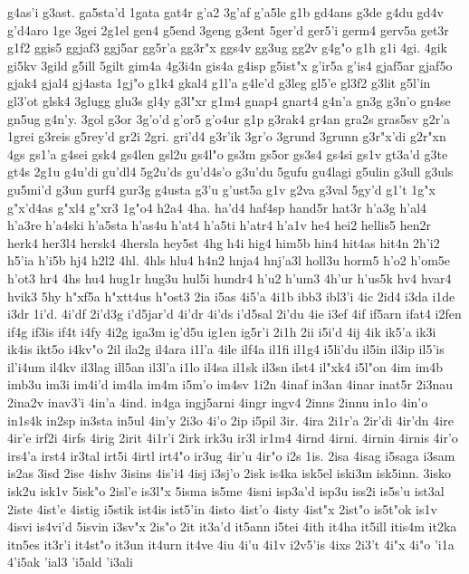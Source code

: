 {g4as'i
g3ast.
ga5sta'd
1gata
gat4r
g'a2
3g'af
g'a5le
g1b
gd4ans
g3de
g4du
gd4v
g'd4aro
1ge
3gei
2g1el
gen4
g5end
3geng
g3ent
5ger'd
ger5'i
germ4
gerv5a
get3r
g1f2
ggis5
ggjaf3
ggj5ar
gg5r'a
gg3r"x
ggs4v
gg3ug
gg2v
g4g"o
g1h
g1i
4gi.
4gik
gi5kv
3gild
g5ill
5gilt
gim4a
4g3i4n
gis4a
g4isp
g5ist"x
g'ir5a
g'is4
gjaf5ar
gjaf5o
gjak4
gjal4
gj4asta
1gj"o
g1k4
gkal4
g1l'a
g4le'd
g3leg
gl5'e
gl3f2
g3lit
g5l'in
gl3'ot
glsk4
3glugg
glu3s
gl4y
g3l"xr
g1m4
gnap4
gnart4
g4n'a
gn3g
g3n'o
gn4se
gn5ug
g4n'y.
3gol
g3or
3g'o'd
g'or5
g'o4ur
g1p
g3rak4
gr4an
gra2s
gras5sv
g2r'a
1grei
g3reis
g5rey'd
gr2i
2gri.
gri'd4
g3r'ik
3gr'o
3grund
3grunn
g3r"x'di
g2r"xn
4gs
gs1'a
g4sei
gsk4
gs4len
gsl2u
gs4l"o
gs3m
gs5or
gs3s4
gs4si
gs1v
gt3a'd
g3te
gt4s
2g1u
g4u'di
gu'dl4
5g2u'ds
gu'd4s'o
g3u'du
5gufu
gu4lagi
g5ulin
g3ull
g3uls
gu5mi'd
g3un
gurf4
gur3g
g4usta
g3'u
g'ust5a
g1v
g2va
g3val
5gy'd
g1't
1g"x
g"x'd4as
g"xl4
g"xr3
1g"o4
h2a4
4ha.
ha'd4
haf4sp
hand5r
hat3r
h'a3g
h'al4
h'a3re
h'a4ski
h'a5sta
h'as4u
h'at4
h'a5ti
h'atr4
h'a1v
he4
hei2
hellis5
hen2r
herk4
her3l4
hersk4
4hersla
hey5st
4hg
h4i
hig4
him5b
hin4
hit4as
hit4n
2h'i2
h5'ia
h'i5b
hj4
h2l2
4hl.
4hls
hlu4
h4n2
hnja4
hnj'a3l
holl3u
horm5
h'o2
h'om5e
h'ot3
hr4
4hs
hu4
hug1r
hug3u
hul5i
hundr4
h'u2
h'um3
4h'ur
h'us5k
hv4
hvar4
hvik3
5hy
h"xf5a
h"xtt4us
h"ost3
2ia
i5as
4i5'a
4i1b
ibb3
ibl3'i
4ic
2id4
i3da
i1de
i3dr
1i'd.
4i'df
2i'd3g
i'd5jar'd
4i'dr
4i'ds
i'd5sal
2i'du
4ie
i3ef
4if
if5arn
ifat4
i2fen
if4g
if3is
if4t
i4fy
4i2g
iga3m
ig'd5u
ig1en
ig5r'i
2i1h
2ii
i5i'd
4ij
4ik
ik5'a
ik3i
ik4is
ikt5o
i4kv"o
2il
ila2g
il4ara
i1l'a
4ile
ilf4a
il1fi
il1g4
i5li'du
il5in
il3ip
il5'is
il'i4um
il4kv
il3lag
ill5an
il3l'a
i1lo
il4sa
il1sk
il3sn
ilst4
il"xk4
i5l"on
4im
im4b
imb3u
im3i
im4i'd
im4la
im4m
i5m'o
im4sv
1i2n
4inaf
in3an
4inar
inat5r
2i3nau
2ina2v
inav3'i
4in'a
4ind.
in4ga
ingj5arni
4ingr
ingv4
2inns
2innu
in1o
4in'o
in1s4k
in2sp
in3sta
in5ul
4in'y
2i3o
4i'o
2ip
i5pil
3ir.
4ira
2i1r'a
2ir'di
4ir'dn
4ire
4ir'e
irf2i
4irfs
4irig
2irit
4i1r'i
2irk
irk3u
ir3l
ir1m4
4irnd
4irni.
4irnin
4irnis
4ir'o
irs4'a
irst4
ir3tal
irt5i
4irtl
irt4"o
ir3ug
4ir'u
4ir"o
i2s
1is.
2isa
4isag
i5saga
i3sam
is2as
3isd
2ise
4ishv
3isins
4is'i4
4isj
i3sj'o
2isk
is4ka
isk5el
iski3m
isk5inn.
3isko
isk2u
isk1v
5isk"o
2isl'e
is3l"x
5isma
is5me
4isni
isp3a'd
isp3u
iss2i
is5s'u
ist3al
2iste
4ist'e
4istig
i5stik
ist4is
ist5'in
4isto
4ist'o
4isty
4ist"x
2ist"o
is5t"ok
is1v
4isvi
is4vi'd
5isvin
i3sv"x
2is"o
2it
it3a'd
it5ann
i5tei
4ith
it4ha
it5ill
itis4m
it2ka
itn5es
it3r'i
it4st"o
it3un
it4urn
it4ve
4iu
4i'u
4i1v
i2v5'is
4ixs
2i3't
4i"x
4i"o
'i1a
4'i5ak
'ial3
'i5ald
'i3ali
}
